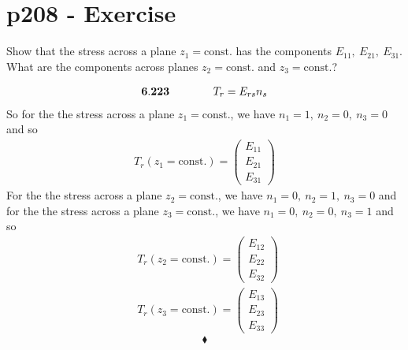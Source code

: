 \section{p208 - Exercise}
\begin{tcolorbox}
Show that the stress across a plane $z_1 = \text{const.}$ has the components $E_{11}, \ E_{21}, \ E_{31}$. What are the components across planes $z_2 = \text{const.}$ and $z_3 = \text{const.}$?
\end{tcolorbox}
\begin{align}
\mathbf{6.223} \quad\quad\quad\quad T_r = E_{rs}n_s
\end{align}
So for the the stress across a plane $z_1 = \text{const.}$, we have $n_1=1, \ n_2=0, \ n_3 = 0$ and so 
\begin{align}
T_r\left(z_1 = \text{const.}\right) = \left(\begin{matrix}E_{11}\\E_{21}\\E_{31}\end{matrix}\right)
\end{align}
For the the stress across a plane $z_2 = \text{const.}$, we have $n_1=0, \ n_2=1, \ n_3 = 0$ and for the the stress across a plane $z_3 = \text{const.}$, we have $n_1=0, \ n_2=0, \ n_3 = 1$ and so
\begin{align}
&T_r\left(z_2 = \text{const.}\right) = \left(\begin{matrix}E_{12}\\E_{22}\\E_{32}\end{matrix}\right)\\
&T_r\left(z_3 = \text{const.}\right) = \left(\begin{matrix}E_{13}\\E_{23}\\E_{33}\end{matrix}\right)\
\end{align}
 $$\blacklozenge$$
\newpage

